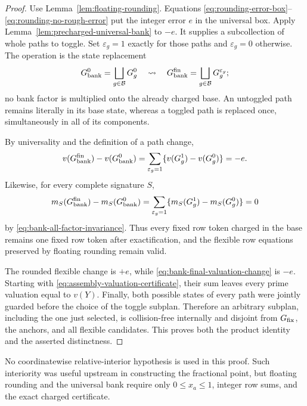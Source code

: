 \documentclass[11pt]{article}
\numberwithin{equation}{section}
\theoremstyle{definition}
\theoremstyle{remark}
\newcommand{\1}{\mathbf 1}
\begin{document}
\begin{proof}
Use Lemma~\ref{lem:floating-rounding}.  Equations
\eqref{eq:rounding-error-box}--\eqref{eq:rounding-no-rough-error} put the
integer error \(e\) in the universal box.  Apply
Lemma~\ref{lem:precharged-universal-bank} to \(-e\).  It supplies a
subcollection of whole paths to toggle.  Set \(\varepsilon_g=1\) exactly
for those paths and \(\varepsilon_g=0\) otherwise.  The operation is the
state replacement
\begin{equation}
 G_{\rm bank}^0=\bigsqcup_{g\in\mathcal B}G_g^0
 \quad\rightsquigarrow\quad
 G_{\rm bank}^{\rm fin}
       =\bigsqcup_{g\in\mathcal B}G_g^{\varepsilon_g};
\label{eq:bank-state-replacement}
\end{equation}
no bank factor is multiplied onto the already charged base.  An
untoggled path remains literally in its base state, whereas a toggled
path is replaced once, simultaneously in all of its components.

By universality and the definition of a path change,
\begin{equation}
 v(G_{\rm bank}^{\rm fin})-v(G_{\rm bank}^0)
 =\sum_{\varepsilon_g=1}
       \{v(G_g^1)-v(G_g^0)\}=-e.
\label{eq:bank-final-valuation-change}
\end{equation}
Likewise, for every complete signature \(S\),
\[
 m_S(G_{\rm bank}^{\rm fin})-m_S(G_{\rm bank}^0)
 =\sum_{\varepsilon_g=1}
       \{m_S(G_g^1)-m_S(G_g^0)\}=0
\]
by \eqref{eq:bank-all-factor-invariance}.  Thus every fixed row token
charged in the base remains one fixed row token after exactification, and
the flexible row equations preserved by floating rounding remain valid.

The rounded flexible change is \(+e\), while
\eqref{eq:bank-final-valuation-change} is \(-e\).  Starting with
\eqref{eq:assembly-valuation-certificate}, their sum leaves every prime
valuation equal to \(v(Y)\).  Finally, both possible states of every path
were jointly guarded before the choice of the toggle subplan.  Therefore
an arbitrary subplan, including the one just selected, is collision-free
internally and disjoint from \(G_{\rm fix}\), the anchors, and all
flexible candidates.  This proves both the product identity and the
asserted distinctness.
\end{proof}

No coordinatewise relative-interior hypothesis is used in this proof.
Such interiority was useful upstream in constructing the fractional point,
but floating rounding and the universal bank require only
\(0\le x_a\le1\), integer row sums, and the exact charged certificate.
\end{document}
